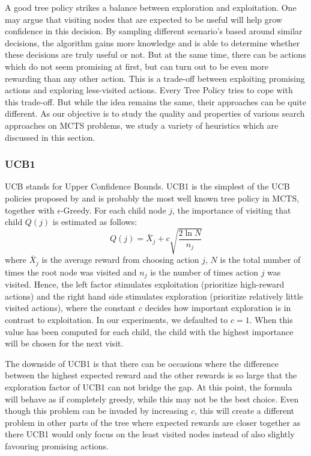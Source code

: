 A good tree policy strikes a balance between exploration and exploitation. One may argue that visiting nodes that are expected to be useful will help grow confidence in this decision. By sampling different scenario's based around similar decisions, the algorithm gains more knowledge and is able to determine whether these decisions are truly useful or not. But at the same time, there can be actions which do not seem promising at first, but can turn out to be even more rewarding than any other action. This is a trade-off between exploiting promising actions and exploring less-visited actions. Every Tree Policy tries to cope with this trade-off. But while the idea remains the same, their approaches can be quite different. As our objective is to study the quality and properties of various search approaches on MCTS problems, we study a variety of heuristics which are discussed in this section.

\subsubsection{UCB1}
UCB stands for Upper Confidence Bounds. UCB1 is the simplest of the UCB policies proposed by \cite{auer2002finite} and is probably the most well known tree policy in MCTS, together with $\epsilon$-Greedy. For each child node $j$, the importance of visiting that child $Q(j)$ is estimated as follows:
\begin{equation}
Q(j) = \bar{X}_j + c\sqrt{\frac{2 \ln N}{n_j}}
\end{equation}
where $\bar{X}_j$ is the average reward from choosing action $j$, $N$ is the total number of times the root node was visited and $n_j$ is the number of times action $j$ was visited. Hence, the left factor stimulates exploitation (prioritize high-reward actions) and the right hand side stimulates exploration (prioritize relatively little visited actions), where the constant $c$ decides how important exploration is in contrast to exploitation. In our experiments, we defaulted to $c=1$. When this value has been computed for each child, the child with the highest importance will be chosen for the next visit. 

The downside of UCB1 is that there can be occasions where the difference between the highest expected reward and the other rewards is so large that the exploration factor of UCB1 can not bridge the gap. At this point, the formula will behave as if completely greedy, while this may not be the best choice. Even though this problem can be invaded by increasing $c$, this will create a different problem in other parts of the tree where expected rewards are closer together as there UCB1 would only focus on the least visited nodes instead of also slightly favouring promising actions. 

